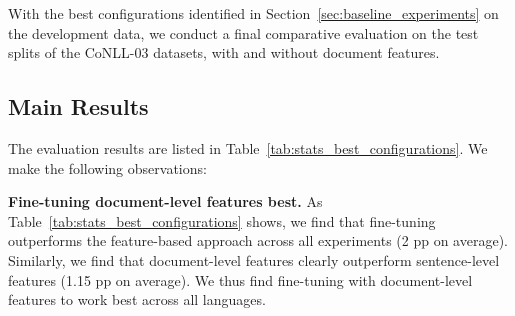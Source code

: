 \documentclass[11pt,a4paper]{article}
\begin{document}
With the best configurations identified in Section~\ref{sec:baseline_experiments} on the development data,    
we conduct a final comparative evaluation on the test splits of the CoNLL-03 datasets, with and without document features.







\subsection{Main Results}

\vspace{-1mm}
The evaluation results are listed in Table~\ref{tab:stats_best_configurations}. We make the following observations:
 



\begin{table}
\centering
{}
\vspace{-2mm}
\caption{Relative change in F1 for different entity types and languages when adding document-level features.}
\label{tab:comparison_context_vs_no_context}
\vspace{-2mm}
\end{table}


\noindent
\textbf{Fine-tuning document-level features best.} As Table~\ref{tab:stats_best_configurations} shows, we find that fine-tuning outperforms the feature-based approach across all experiments (2 pp on average). 
Similarly, we find that document-level features clearly outperform sentence-level features (1.15 pp on average). We thus find fine-tuning with document-level features to work best across all languages. 
\end{document}
